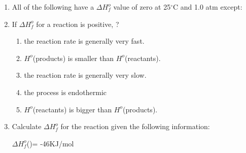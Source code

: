 \documentclass[main.tex]{subfiles}
\begin{document}
\begin{fullwidth}
\begin{multicols*}{2}
\begin{enumerate}
\item All of the following have a $\Delta H^o_f$ value of zero at 25$^{\circ}$C and 1.0 atm except:
\begin{enumerate}[label=(\alph*)]\vspace{-0.5cm}
\end{enumerate}\vspace{-0.5cm}

\item If $\Delta H^o_f$ for a reaction is positive, ?
\begin{enumerate}[label=(\alph*)]
\item  the reaction rate is generally very fast.
\item  $H^o$(products) is smaller than $H^o$(reactants).
\item  the reaction rate is generally very slow.
\item  the process is endothermic
\item  $H^o$(reactants) is bigger than $H^o$(products). 
\end{enumerate}

\item Calculate $\Delta H^o_f$ for the reaction given the following information:
	\begin{center}\end{center}	
$\Delta H^o_f$()= -46KJ/mol
\begin{enumerate}[label=(\alph*)]\vspace{-0.5cm}
\end{enumerate}\vspace{-0.5cm}








\end{enumerate}
\end{multicols*}
\end{fullwidth}
\end{document}
